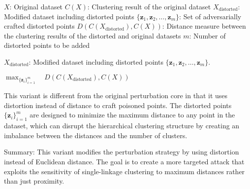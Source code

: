 $X$: Original dataset  
$C(X)$: Clustering result of the original dataset  
$X_{\text{distorted}}$: Modified dataset including distorted points  
$\{\mathbf{z}_1, \mathbf{z}_2, \ldots, \mathbf{z}_m\}$: Set of adversarially crafted distorted points  
$D(C(X_{\text{distorted}}), C(X))$: Distance measure between the clustering results of the distorted and original datasets  
$m$: Number of distorted points to be added  


$X_{\text{distorted}}$: Modified dataset including distorted points $\{\mathbf{z}_1, \mathbf{z}_2, \ldots, \mathbf{z}_m\}$.

$\max_{\{\mathbf{z}_i\}_{i=1}^m} \quad D(C(X_{\text{distorted}}), C(X))$

This variant is different from the original perturbation core in that it uses distortion instead of distance to craft poisoned points. The distorted points $\{\mathbf{z}_i\}_{i=1}^m$ are designed to minimize the maximum distance to any point in the dataset, which can disrupt the hierarchical clustering structure by creating an imbalance between the distances and the number of clusters.

Summary: This variant modifies the perturbation strategy by using distortion instead of Euclidean distance. The goal is to create a more targeted attack that exploits the sensitivity of single-linkage clustering to maximum distances rather than just proximity.